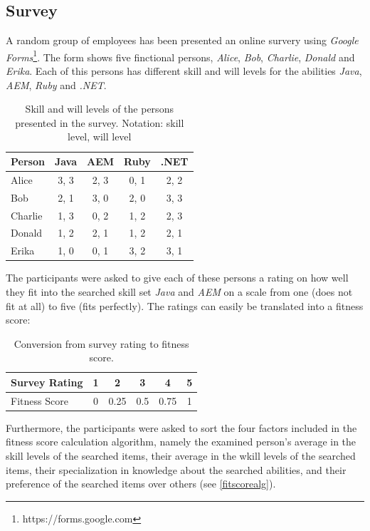 \newpage

\subsection{Survey}
A random group of employees has been presented an online survery using \textit{Google Forms}\footnote{https://forms.google.com}. The form shows five finctional persons, \textit{Alice}, \textit{Bob}, \textit{Charlie}, \textit{Donald} and \textit{Erika}. Each of this persons has different skill and will levels for the
abilities \textit{Java}, \textit{AEM}, \textit{Ruby} and \textit{.NET}.

\begin{table}[H]
\centering
  \begin{tabular}{l||c|c|c|c}
		Person  & Java & AEM & Ruby & .NET \\
		\hline
		Alice   & 3, 3   & 2, 3  & 0, 1   & 2, 2 \\
		Bob     & 2, 1   & 3, 0  & 2, 0   & 3, 3 \\
		Charlie & 1, 3   & 0, 2  & 1, 2   & 2, 3 \\
		Donald  & 1, 2   & 2, 1  & 1, 2   & 2, 1 \\
		Erika   & 1, 0   & 0, 1  & 3, 2   & 3, 1 \\
  \end{tabular}
\caption[Survey Test Persons]{Skill and will levels of the persons presented in the survey. Notation: skill level, will level}
\end{table}

The participants were asked to give each of these persons a rating on how well they fit into the searched skill set \textit{Java} and \textit{AEM} on a scale from one (does not fit at all) to five (fits perfectly). The ratings can easily be translated into a fitness score:

\begin{table}[H]
\centering
\begin{tabular}{l||c|c|c|c|c}
	Survey Rating & 1 & 2    & 3   & 4    & 5\\
	\hline
	Fitness Score & 0 & 0.25 & 0.5 & 0.75 & 1\\
\end{tabular}
\caption[Surver Rating to Fitness Score]{Conversion from survey rating to fitness score.}
\end{table}

Furthermore, the participants were asked to sort the four factors included in the fitness score calculation algorithm, namely the examined person's average in the skill levels of the searched items, their average in the wkill levels of the searched items, their specialization in knowledge about the searched abilities, and their preference of the searched items over others (see \ref{fitscorealg}).

